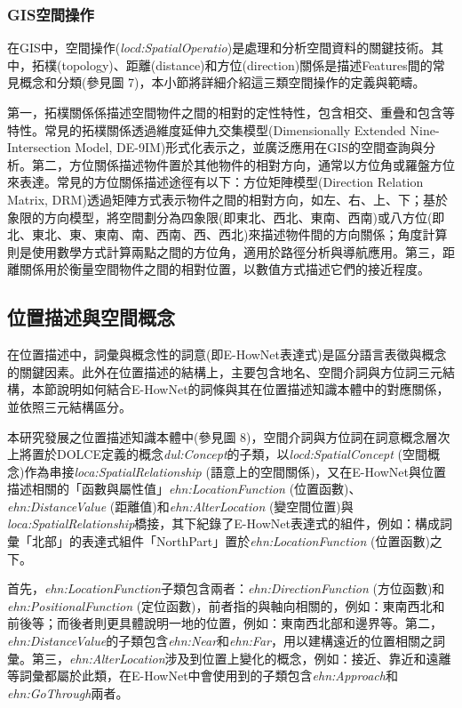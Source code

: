 

\subsubsection{GIS空間操作}

在GIS中，空間操作(\textit{locd:SpatialOperatio})是處理和分析空間資料的關鍵技術。其中，拓樸(topology)、距離(distance)和方位(direction)關係是描述Features間的常見概念和分類(參見圖 7)，本小節將詳細介紹這三類空間操作的定義與範疇。

第一，拓樸關係係描述空間物件之間的相對的定性特性，包含相交、重疊和包含等特性。常見的拓樸關係透過維度延伸九交集模型(Dimensionally Extended Nine-Intersection Model, DE-9IM)形式化表示之，並廣泛應用在GIS的空間查詢與分析。第二，方位關係描述物件置於其他物件的相對方向，通常以方位角或羅盤方位來表達。常見的方位關係描述途徑有以下：方位矩陣模型(Direction Relation Matrix, DRM)透過矩陣方式表示物件之間的相對方向，如左、右、上、下\citep{RN183}；基於象限的方向模型，將空間劃分為四象限(即東北、西北、東南、西南)或八方位(即北、東北、東、東南、南、西南、西、西北)來描述物件間的方向關係；角度計算則是使用數學方式計算兩點之間的方位角，適用於路徑分析與導航應用。第三，距離關係用於衡量空間物件之間的相對位置，以數值方式描述它們的接近程度。

\subsection{位置描述與空間概念}

在位置描述中，詞彙與概念性的詞意(即E-HowNet表達式)是區分語言表徵與概念的關鍵因素。此外在位置描述的結構上，主要包含地名、空間介詞與方位詞三元結構，本節說明如何結合E-HowNet的詞條與其在位置描述知識本體中的對應關係，並依照三元結構區分。

本研究發展之位置描述知識本體中(參見圖 8)，空間介詞與方位詞在詞意概念層次上將置於DOLCE定義的概念\textit{dul:Concept}的子類，以\textit{locd:SpatialConcept} (空間概念)作為串接\textit{loca:SpatialRelationship} (語意上的空間關係)，又在E-HowNet與位置描述相關的「函數與屬性值」\textit{ehn:LocationFunction} (位置函數)、\textit{ehn:DistanceValue} (距離值)和\textit{ehn:AlterLocation} (變空間位置)與\textit{loca:SpatialRelationship}橋接，其下紀錄了E-HowNet表達式的組件，例如：構成詞彙「北部」的表達式組件「NorthPart」置於\textit{ehn:LocationFunction} (位置函數)之下。

首先，\textit{ehn:LocationFunction}子類包含兩者：\textit{ehn:DirectionFunction} (方位函數)和\textit{ehn:PositionalFunction} (定位函數)，前者指的與軸向相關的，例如：東南西北和前後等；而後者則更具體說明一地的位置，例如：東南西北部和邊界等。第二，\textit{ehn:DistanceValue}的子類包含\textit{ehn:Near}和\textit{ehn:Far}，用以建構遠近的位置相關之詞彙。第三，\textit{ehn:AlterLocation}涉及到位置上變化的概念，例如：接近、靠近和遠離等詞彙都屬於此類，在E-HowNet中會使用到的子類包含\textit{ehn:Approach}和\textit{ehn:GoThrough}兩者。

